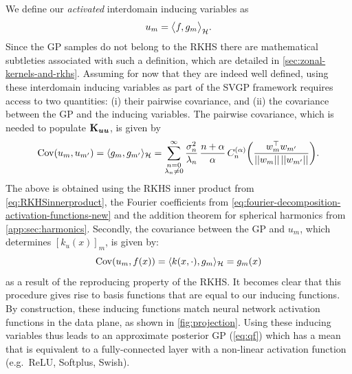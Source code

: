 We define our \emph{activated} interdomain inducing variables as
\begin{equation}
\label{eq:def-inducing-variable}
    u_m = \big\langle f, {g}_m \big\rangle_{{\mathcal{H}}}.
\end{equation}
Since the GP samples do not belong to the RKHS there are mathematical subtleties associated with such a definition, which are detailed in \cref{sec:zonal-kernels-and-rkhs}. Assuming for now that they are indeed well defined, using these interdomain inducing variables as part of the SVGP framework requires access to two quantities: (i) their pairwise covariance, and (ii) the covariance between the GP and the inducing variables. The pairwise covariance, which is needed to populate $\mathbf{{K}}_{\bm{u} \bm{u}}$, is given by
\begin{equation}
\label{eq:kuu}
\Cov(u_{m}, u_{m'})
= \langle {g}_m, {g}_{m'} \rangle_\rkhs
= \sum_{\substack{n=0 \\ \lambda_n \neq 0}}^{\infty}
    \frac{\sigma_n^2}{\lambda_n}\,\frac{n + \alpha}{\alpha}\,C_n^{(\alpha)}\left(\frac{w_m^\top w_{m'}}{\norm{w_m}\,\norm{w_{m'}}}\right).  
\end{equation}
The above is obtained using the RKHS inner product from \cref{eq:RKHSinnerproduct}, the Fourier coefficients from \cref{eq:fourier-decomposition-activation-functions-new} and the addition theorem for spherical harmonics from \cref{app:sec:harmonics}. Secondly, the covariance between the GP and $u_m$, which determines $[k_u(x)]_m$, is given by:
\begin{equation}
\label{eq:kuf}
  \mathrm{Cov}(u_m, f(x)) = 
    \langle k(x, \cdot), {g}_m \rangle_{{\mathcal{H}}} = {g}_m(x) 
\end{equation}
as a result of the reproducing property of the RKHS. It becomes clear that this procedure gives rise to basis functions that are equal to our inducing functions. By construction, these inducing functions match neural network activation functions in the data plane, as shown in \cref{fig:projection}. Using these inducing variables thus leads to an approximate posterior GP (\cref{eq:qf}) which has a mean that is equivalent to a fully-connected layer with a non-linear activation function (e.g.~ReLU, Softplus, Swish). 


